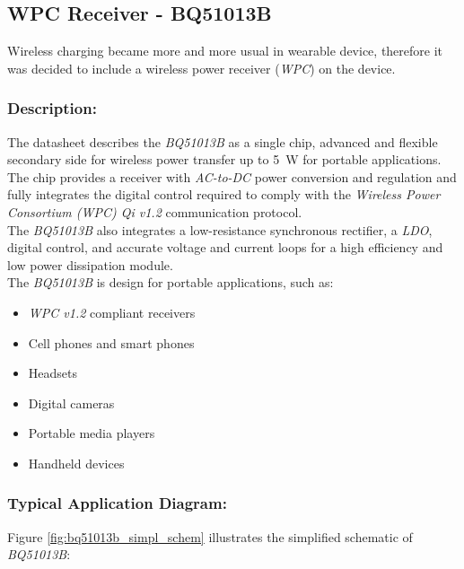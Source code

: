 \documentclass[report.tex]{subfiles}
\begin{document}
\subsection{WPC Receiver - BQ51013B}
Wireless charging became more and more usual in wearable device, therefore it was decided to include a wireless power receiver (\textit{WPC}) on the device.

\subsubsection{Description:}

The datasheet\cite{BQ51013B} describes the \textit{BQ51013B} as a single chip, advanced  and flexible secondary side for wireless power transfer up to \SI{5}{\watt} for portable applications. The chip provides a receiver with \textit{AC-to-DC} power conversion and regulation and fully integrates the digital control required to comply with the \textit{Wireless Power Consortium (WPC) Qi v1.2} communication protocol.\\

The \textit{BQ51013B} also integrates a low-resistance synchronous rectifier, a \textit{LDO}, digital control, and accurate voltage and current loops for a high efficiency and low power dissipation module.\\

 The \textit{BQ51013B} is design for portable applications, such as:
\begin{itemize}
\item \textit{WPC v1.2} compliant receivers
\item Cell phones and smart phones
\item Headsets
\item Digital cameras
\item Portable media players
\item Handheld devices
\end{itemize}

\subsubsection{Typical Application Diagram:}

Figure \ref{fig:bq51013b_simpl_schem} illustrates the simplified schematic of \textit{BQ51013B}:
\end{document}
